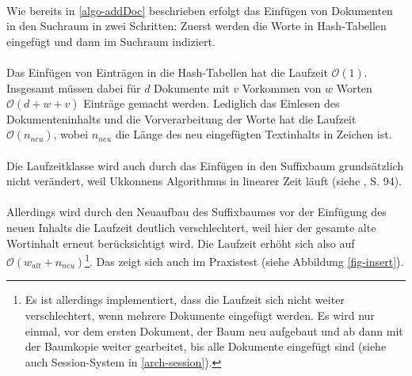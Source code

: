 \paragraph{} Wie bereits in \ref{algo-addDoc} beschrieben erfolgt das Einfügen von Dokumenten in den Suchraum in zwei Schritten: Zuerst werden die Worte in Hash-Tabellen eingefügt und dann im Suchraum indiziert.
\paragraph{} Das Einfügen von Einträgen in die Hash-Tabellen hat die Laufzeit $\mathcal{O}(1)$. Insgesamt müssen dabei für $d$ Dokumente mit $v$ Vorkommen von $w$ Worten $\mathcal{O}(d + w + v)$ Einträge gemacht werden. Lediglich das Einlesen des Dokumenteninhalts und die Vorverarbeitung der Worte hat die Laufzeit $\mathcal{O}(n_{neu})$, wobei $n_{neu}$ die Länge des neu eingefügten Textinhalts in Zeichen ist.
\paragraph{} Die Laufzeitklasse wird auch durch das Einfügen in den Suffixbaum grundsätzlich nicht verändert, weil Ukkonnens Algorithmus in linearer Zeit läuft (siehe \cite{gusfield}, S. 94).
\paragraph{} Allerdings wird durch den Neuaufbau des Suffixbaumes vor der Einfügung des neuen Inhalts die Laufzeit deutlich verschlechtert, weil hier der gesamte alte Wortinhalt erneut berücksichtigt wird. Die Laufzeit erhöht sich also auf $\mathcal{O}(w_{alt} + n_{neu})$\footnote{Es ist allerdings implementiert, dass die Laufzeit sich nicht weiter verschlechtert, wenn mehrere Dokumente eingefügt werden. Es wird nur einmal, vor dem ersten Dokument, der Baum neu aufgebaut und ab dann mit der Baumkopie weiter gearbeitet, bis alle Dokumente eingefügt sind (siehe auch Session-System in \ref{arch-session}).}. Das zeigt sich auch im Praxistest (siehe Abbildung \ref{fig-insert}).


